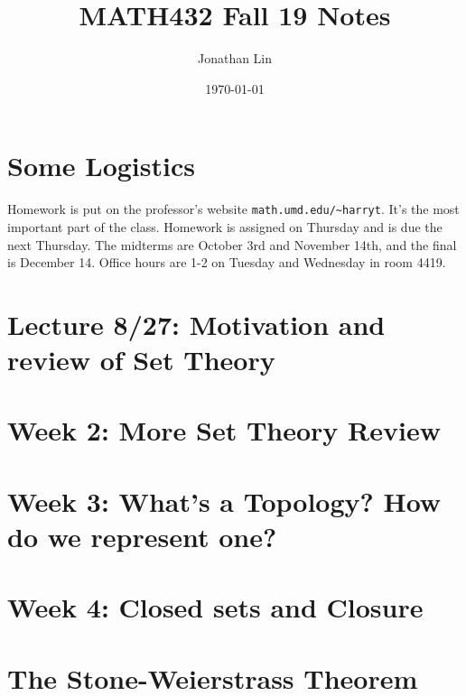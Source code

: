 \documentclass[12pt]{article}
\title{MATH432 Fall 19 Notes}
\author{Jonathan Lin}
\date{\today}
\theoremstyle{plain}
\theoremstyle{definition}
\begin{document}
\maketitle

\section{Some Logistics}
Homework is put on the professor's website \verb|math.umd.edu/~harryt|. It's the most important part of the class. Homework is assigned on Thursday and is due the next Thursday. The midterms are October 3rd and November 14th, and the final is December 14. Office hours are 1-2 on Tuesday and Wednesday in room 4419.

\section{Lecture 8/27: Motivation and review of Set Theory}



\section{Week 2: More Set Theory Review}


\section{Week 3: What's a Topology? How do we represent one?}



\section{Week 4: Closed sets and Closure}



\section{The Stone-Weierstrass Theorem}


\end{document}
